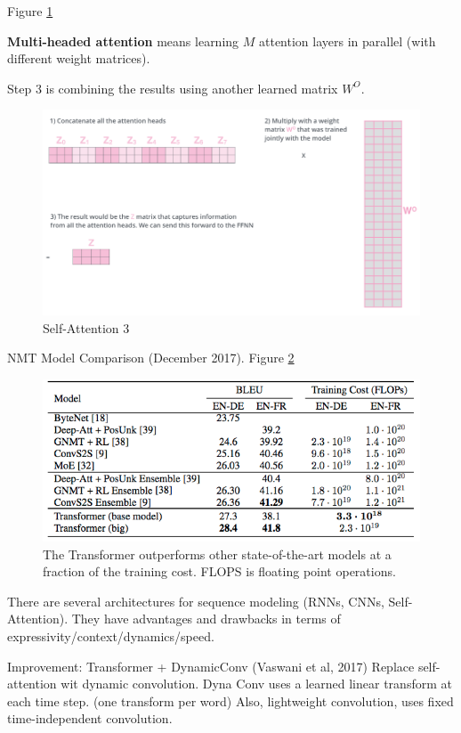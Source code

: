 \documentclass[english]{article}
\begin{document}
\item  Figure \ref{Self-Attention 3}

\textbf{Multi-headed attention} means learning $M$ attention layers in parallel (with different weight matrices).

Step 3 is combining the results using another learned matrix $W^O$.
\begin{figure}
\centering
\includegraphics[width=1\linewidth]{self-attention3.png}
    \caption{Self-Attention 3}
    \label{Self-Attention 3}
\end{figure} 
 

\item 
 {NMT Model Comparison (December 2017)}.  Figure \ref{TheT}

\begin{figure}
\centering
\includegraphics[height=0.3\linewidth]{nmt-compare2.png}
\caption{The Transformer outperforms other state-of-the-art models at a fraction of the training cost. FLOPS is floating point operations.}
\label{TheT}
\end{figure}
 

\item There are several architectures for sequence modeling (RNNs, CNNs, Self-Attention). They have advantages and drawbacks in terms of expressivity/context/dynamics/speed.

Improvement: Transformer + DynamicConv (Vaswani et al, 2017) Replace self-attention wit dynamic convolution. Dyna Conv uses a learned linear transform at each time step. (one transform per word) Also, lightweight convolution, uses fixed time-independent convolution.
\end{document}
